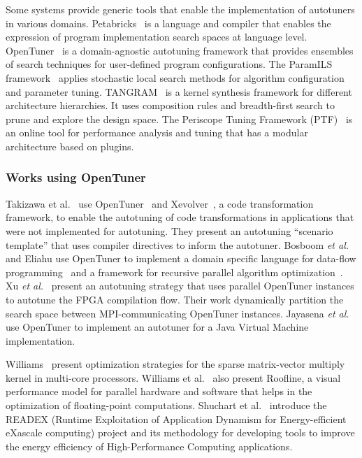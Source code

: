 Some systems provide generic tools that enable the implementation of autotuners
in various domains.  Petabricks~\cite{ansel2009petabricks} is a language and
compiler that enables the expression of program implementation search spaces at
language level.  OpenTuner~\cite{ansel2014opentuner} is a domain-agnostic
autotuning framework that provides ensembles of search techniques for
user-defined program configurations.  The ParamILS
framework~\cite{hutter2009paramils} applies stochastic local search methods for
algorithm configuration and parameter tuning.
TANGRAM~\cite{chang2015tangram,chang2016efficient} is a kernel synthesis
framework for different architecture hierarchies.  It uses composition rules
and breadth-first search to prune and explore the design space.  The Periscope
Tuning Framework
(PTF)~\cite{gerndt2005periscope,gerndt2010automatic,gerndt2017multi} is an
online tool for performance analysis and tuning that has a modular architecture
based on plugins.

\subsubsection{Works using OpenTuner}

Takizawa et al.~\cite{takizawa2017customizable} use
OpenTuner~\cite{ansel2014opentuner} and Xevolver~\cite{takizawa2014xevolver}, a
code transformation framework, to enable the autotuning of code transformations
in applications that were not implemented for autotuning. They present an
autotuning ``scenario template'' that uses compiler directives to inform the
autotuner.  Bosboom \emph{et al.} and Eliahu use OpenTuner to implement a
domain specific language for data-flow programming~\cite{bosboom2014streamjit}
and a framework for recursive parallel algorithm
optimization~\cite{eliahu2015frpa}.  Xu \emph{et al.}~\cite{xu2017parallel}
present an autotuning strategy that uses parallel OpenTuner instances to
autotune the FPGA compilation flow.  Their work dynamically partition the
search space between MPI-communicating OpenTuner instances.  Jayasena \emph{et
al.}~\cite{jayasena2015auto} use OpenTuner to implement an autotuner for a Java
Virtual Machine implementation.


Williams~\cite{williams2009optimization} present optimization strategies for
the sparse matrix-vector multiply kernel in multi-core processors.  Williams et
al.~\cite{williams2009roofline} also present Roofline, a visual performance
model for parallel hardware and software that helps in the optimization of
floating-point computations.  Shuchart et al.~\cite{schuchart2017readex}
introduce the READEX (Runtime Exploitation of Application Dynamism for
Energy-efficient eXascale computing) project and its methodology for developing
tools to improve the energy efficiency of High-Performance Computing
applications.

